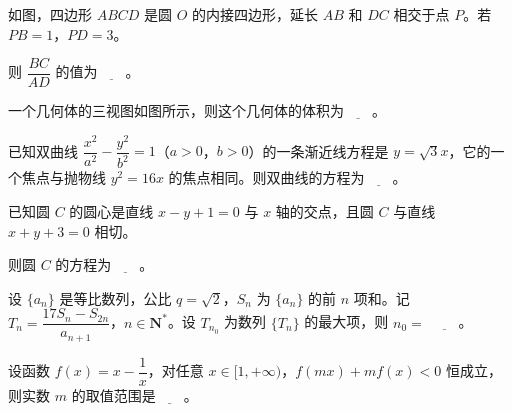 \Needspace{0.4\textheight}
\begin{question}
如图，四边形 $ABCD$ 是圆 $O$ 的内接四边形，延长 $AB$ 和 $DC$ 相交于点 $P$。若 $PB=1$，$PD=3$。

则 $\dfrac{BC}{AD}$ 的值为$\underline{\qquad}$。
\nopagebreak[4]
\begin{center}\end{center}
\nopagebreak[4]
\Needspace{0.4\textheight}
\end{question}
\begingroup
\renewenvironment{question}{\Needspace{0.5\textheight}}{}
\begin{question}
一个几何体的三视图如图所示，则这个几何体的体积为$\underline{\qquad}$。
\nopagebreak[4]
\begin{center}\end{center}
\nopagebreak[4]
\end{question}
\endgroup
\begin{question}
已知双曲线 $\dfrac{x^2}{a^2}-\dfrac{y^2}{b^2}=1$（$a>0$，$b>0$）的一条渐近线方程是 $y=\sqrt3x$，它的一个焦点与抛物线 $y^2=16x$ 的焦点相同。则双曲线的方程为$\underline{\qquad}$。

\end{question}
\begin{question}
已知圆 $C$ 的圆心是直线 $x-y+1=0$ 与 $x$ 轴的交点，且圆 $C$ 与直线 $x+y+3=0$ 相切。

则圆 $C$ 的方程为$\underline{\qquad}$。

\end{question}
\begin{question}
设 $\{a_n\}$ 是等比数列，公比 $q=\sqrt2$，$S_n$ 为 $\{a_n\}$ 的前 $n$ 项和。记 $T_n=\dfrac{17S_n-S_{2n}}{a_{n+1}}$，$n\in\mathbf N^*$。设 $T_{n_0}$ 为数列 $\{T_n\}$ 的最大项，则 $n_0=$ $\underline{\qquad}$。

\end{question}
\begin{question}
设函数 $f(x)=x-\dfrac1x$，对任意 $x\in[1,+\infty)$，$f(mx)+mf(x)<0$ 恒成立，则实数 $m$ 的取值范围是$\underline{\qquad}$。

\end{question}

